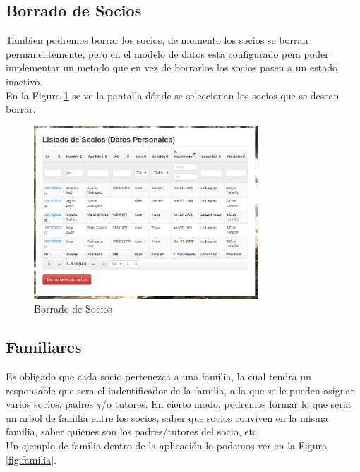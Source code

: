 \subsection{Borrado de Socios}
Tambien podremos borrar los socios, de momento los socios se borran permanentemente, pero en el modelo de datos esta configurado pera poder implementar un metodo que en vez de borrarlos los socios pasen
a un estado inactivo.\\

En la Figura \ref{fig:borrar_socio} se ve la pantalla dónde se seleccionan los socios que se desean borrar.\\

\begin{figure}[H]
\begin{center}
\includegraphics[width=0.75\textwidth]{images/borrado_socios.jpg}
\caption{Borrado de Socios}
\label{fig:borrar_socio}
\end{center}
\end{figure}

\subsection{Familiares}

Es obligado que cada socio pertenezca a una familia, la cual tendra un responsable que sera el indentificador de la familia, a la que se le pueden asignar varios socios, padres y/o tutores. En cierto modo, podremos
formar lo que seria un arbol de familia entre los socios, saber que socios conviven en la misma familia, saber quienes son los padres/tutores del socio, etc.\\

Un ejemplo de familia dentro de la aplicación lo podemos ver en la Figura \ref{fig:familia}.\\

